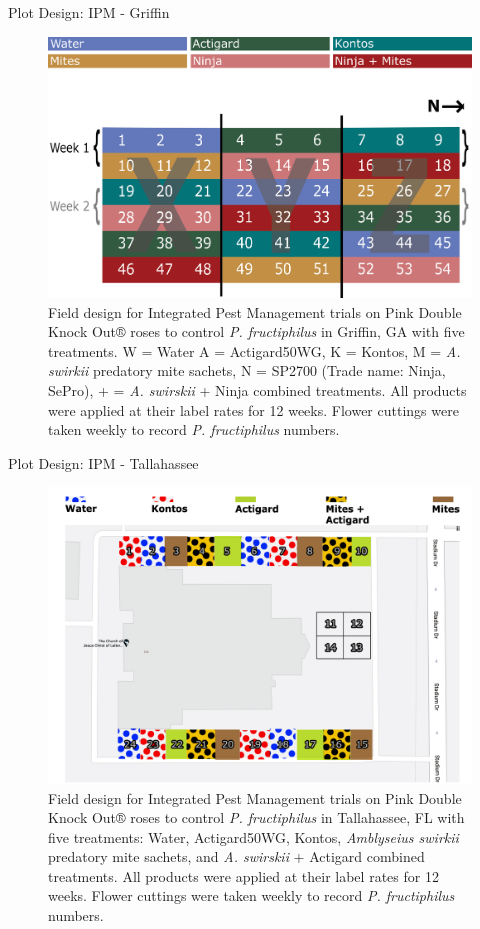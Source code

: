\documentclass[
  ignorenonframetext,
]{beamer}
\begin{document}
\begin{frame}
\begin{block}{Plot Design: IPM - Griffin}
\protect\hypertarget{plot-design-ipm---griffin}{}
\begin{figure}
\includegraphics[width=0.8\linewidth]{figure/rrv_ipm_plot_map_2019_griffin} \caption{Field design for Integrated Pest Management trials on Pink Double Knock Out® roses to control \textit{P. fructiphilus} in Griffin, GA with five treatments. W = Water A = Actigard50WG, K = Kontos, M = \textit{A. swirkii} predatory mite sachets, N = SP2700 (Trade name: Ninja, SePro), + = \textit{A. swirskii} + Ninja combined treatments. All products were applied at their label rates for 12 weeks. Flower cuttings were taken weekly to record \textit{P. fructiphilus} numbers.}\label{fig:ipm-griff}
\end{figure}
\end{block}

\begin{block}{Plot Design: IPM - Tallahassee}
\protect\hypertarget{plot-design-ipm---tallahassee}{}
\begin{figure}
\includegraphics[width=0.8\linewidth]{asa-presentation-2021-denver_files/figure-beamer/unnamed-chunk-3-1} \caption{Field design for Integrated Pest Management trials on Pink Double Knock Out® roses to control \textit{P. fructiphilus} in Tallahassee, FL with five treatments: Water, Actigard50WG, Kontos, \textit{Amblyseius swirkii} predatory mite sachets, and \textit{A. swirskii} + Actigard combined treatments. All products were applied at their label rates for 12 weeks. Flower cuttings were taken weekly to record \textit{P. fructiphilus} numbers.}\label{fig:unnamed-chunk-3}
\end{figure}
\end{block}
\end{frame}
\end{document}
